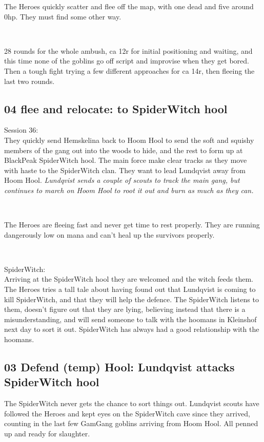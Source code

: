 The Heroes quickly scatter and flee off the map, with one dead and five around 0hp. They must find some other way.

\

28 rounds for the whole ambush, ca 12r for initial positioning and waiting, and this time none of the goblins go off script and improvise when they get bored. Then a tough fight trying a few different approaches for ca 14r, then fleeing the last two rounds.


\subsection*{04 flee and relocate: to SpiderWitch hool}

\forceindent Session 36:\\                                              %
They quickly send Hemskelina back to Hoom Hool to send the soft and squishy members of the gang out into the woods to hide, and the rest to form up at BlackPeak SpiderWitch hool. The main force make clear tracks as they move with haste to the SpiderWitch clan. They want to lead Lundqvist away from Hoom Hool.
\emph{Lundqvist sends a couple of scouts to track the main gang, but continues to march on Hoom Hool to root it out and burn as much as they can.}

\

The Heroes are fleeing fast and never get time to rest properly. They are running dangerously low on mana and can't heal up the survivors properly.

\

SpiderWitch:\\
Arriving at the SpiderWitch hool they are welcomed and the witch feeds them. The Heroes tries a tall tale about having found out that Lundqvist is coming to kill SpiderWitch, and that they will help the defence. The SpiderWitch listens to them, doesn't figure out that they are lying, believing instead that there is a misunderstanding, and will send someone to talk with the hoomans in Kleinshof next day to sort it out. SpiderWitch has always had a good relationship with the hoomans.


\subsection*{03 Defend (temp) Hool: Lundqvist attacks SpiderWitch hool}

The SpiderWitch never gets the chance to sort things out. Lundqvist scouts have followed the Heroes and kept eyes on the SpiderWitch cave since they arrived, counting in the last few GamGang goblins arriving from Hoom Hool. All penned up and ready for slaughter.

